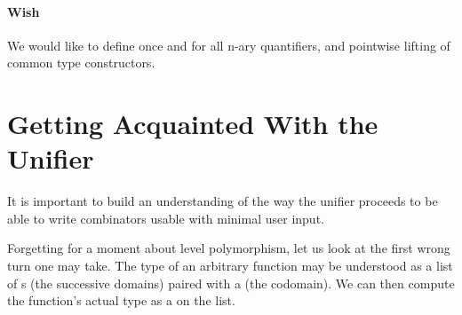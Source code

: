 \paragraph{Wish} We would like to define once and for all n-ary quantifiers,
and pointwise lifting of common type constructors.


\section{Getting Acquainted With the Unifier}

It is important to build an understanding of the way the unifier proceeds
to be able to write combinators usable with minimal user input.

Forgetting for a moment about level polymorphism, let us look at the first
wrong turn one may take. The type of an arbitrary function may be understood
as a list of s (the successive domains) paired with a  (the
codomain). We can then compute the function's actual type as a  on
the list.




